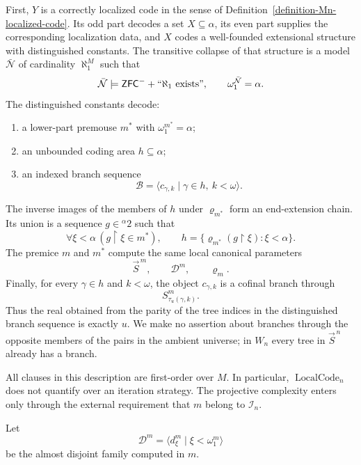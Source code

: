 \documentclass[a4paper,11pt]{article}
\newcommand{\ZFCminus}{\mathsf{ZFC}^{-}}
\begin{document}
First, $Y$ is a correctly localized code in the sense of
Definition~\ref{definition-Mn-localized-code}.  Its odd part decodes a set
$X\subseteq\alpha$, its even part supplies the corresponding localization data,
and $X$ codes a well-founded extensional structure with distinguished
constants.  The transitive collapse of that structure is a model
$\bar{\mathcal N}$ of cardinality $\aleph_1^M$ such that
\[
   \bar{\mathcal N}\models
      \ZFCminus+``\aleph_1\text{ exists}",
   \qquad
   \omega_1^{\bar{\mathcal N}}=\alpha.
\]
The distinguished constants decode:
\begin{enumerate}
   \item a lower-part premouse $m^\ast$ with
         $\omega_1^{m^\ast}=\alpha$;
   \item an unbounded coding area $h\subseteq\alpha$;
   \item an indexed branch sequence
         \[
            \mathcal B
            =\langle c_{\gamma,k}
               \mid\gamma\in h,\ k<\omega\rangle.
         \]
\end{enumerate}
The inverse images of the members of $h$ under $\varrho_{m^\ast}$ form an
end-extension chain.  Its union is a sequence
$g\in{}^\alpha2$ such that
\[
   \forall\xi<\alpha\,
   (g\restriction\xi\in m^\ast),
   \qquad
   h=\{\varrho_{m^\ast}(g\restriction\xi):
        \xi<\alpha\}.
\]
The premice $m$ and $m^\ast$ compute the same local canonical parameters
\[
   \vec S^{\,m},\qquad
   \mathcal D^m,\qquad
   \varrho_m.
\]
Finally, for every $\gamma\in h$ and $k<\omega$, the object
$c_{\gamma,k}$ is a cofinal branch through
\[
   S^m_{\tau_u(\gamma,k)}.
\]
Thus the real obtained from the parity of the tree indices in the
distinguished branch sequence is exactly $u$.  We make no assertion about
branches through the opposite members of the pairs in the ambient universe;
in $W_n$ every tree in $\vec S^{\,n}$ already has a branch.

All clauses in this description are first-order over $M$.  In particular,
$\operatorname{LocalCode}_n$ does not quantify over an iteration strategy.
The projective complexity enters only through the external requirement that
$m$ belong to $\mathcal I_n$.

Let
\[
   \mathcal D^m
   =\langle d^m_\xi\mid\xi<\omega_1^m\rangle
\]
be the almost disjoint family computed in $m$.
\end{document}
